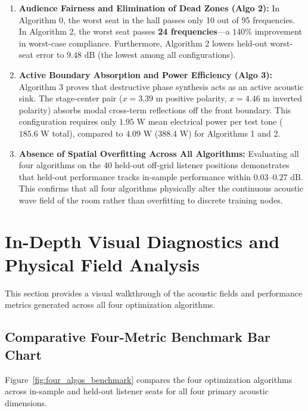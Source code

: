 \documentclass[11pt,a4paper,titlepage]{article}
\begin{document}
\begin{enumerate}
    \item \textbf{Audience Fairness and Elimination of Dead Zones (Algo 2):} In Algorithm 0, the worst seat in the hall passes only 10 out of 95 frequencies. In Algorithm 2, the worst seat passes \textbf{24 frequencies}—a $140\%$ improvement in worst-case compliance. Furthermore, Algorithm 2 lowers held-out worst-seat error to $9.48\text{ dB}$ (the lowest among all configurations).
    \item \textbf{Active Boundary Absorption and Power Efficiency (Algo 3):} Algorithm 3 proves that destructive phase synthesis acts as an active acoustic sink. The stage-center pair ($x = 3.39\text{ m}$ positive polarity, $x = 4.46\text{ m}$ inverted polarity) absorbs modal cross-term reflections off the front boundary. This configuration requires only $1.95\text{ W}$ mean electrical power per test tone ($185.6\text{ W}$ total), compared to $4.09\text{ W}$ ($388.4\text{ W}$) for Algorithms 1 and 2.
    \item \textbf{Absence of Spatial Overfitting Across All Algorithms:} Evaluating all four algorithms on the 40 held-out off-grid listener positions demonstrates that held-out performance tracks in-sample performance within $0.03\text{--}0.27\text{ dB}$. This confirms that all four algorithms physically alter the continuous acoustic wave field of the room rather than overfitting to discrete training nodes.
\end{enumerate}

\newpage

\section{In-Depth Visual Diagnostics and Physical Field Analysis}

This section provides a visual walkthrough of the acoustic fields and performance metrics generated across all four optimization algorithms.

\subsection{Comparative Four-Metric Benchmark Bar Chart}
Figure~\ref{fig:four_algos_benchmark} compares the four optimization algorithms across in-sample and held-out listener seats for all four primary acoustic dimensions.
\end{document}
